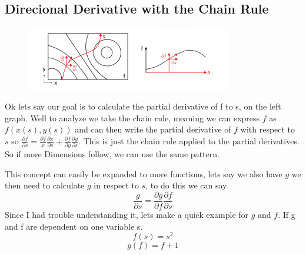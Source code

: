 \documentclass[a4paper]{article}
\begin{document}
 \subsection{Direcional Derivative with the Chain Rule}
 \begin{figure}[h]
    \centering
    \includegraphics[width=0.8\textwidth]{images/richtungsableitung.png}
    \caption{}
    \label{fig:Richtungsableitung}
\end{figure}
Ok lets say our goal is to calculate the partial derivative of f to s, on the left graph.  Well to analyze we take the chain rule, meaning we can express $f$ as $f(x(s),y(s))$ and can then write the partial derivative of $f$ with respect to $s$ so $\frac{\partial f}{\partial s} = \frac{\partial f}{x} \frac{\partial x}{\partial s} + \frac{\partial f}{\partial y} \frac{\partial y}{\partial s}$. This is just the chain rule applied to the partial derivatives.
So if more Dimensions follow, we can use the same pattern. 
\begin{center}
    

\end{center}
This concept can easily be expanded to more functions, lets say we also have $g$ we then need to calculate $g$ in respect to $s$, to do this we can say $$\frac{g}{\partial s} = \frac{\partial g}{\partial f} \frac{\partial f}{\partial s}$$  Since I had trouble understanding it, lets make a quick example for $g$ and $f$. 
If g and f are dependent on one variable s. 
\[
f(s) = s^2
\]
\[
g(f) = f + 1
\]
\end{document}
